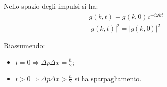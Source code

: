 Nello spazio degli impulsi si ha:
\begin{equation}\begin{split}
g\left(k,t\right)=g\left(k,0\right)e^{-i\omega kt}\\
|g\left(k,t\right)|^2=|g\left(k,0\right)|^2
\end{split}\end{equation}

Riassumendo:
\begin{itemize}
\item $t=0 \Longrightarrow \Delta p\Delta x=\frac{\hbar }{2}$;
\item $t>0 \Longrightarrow \Delta p\Delta x>\frac{\hbar }{2}$ si ha sparpagliamento.
\end{itemize}
